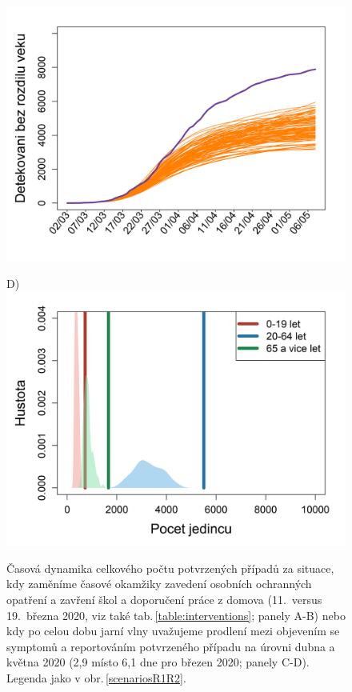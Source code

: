 \begin{figure}
\begin{center}
\begin{minipage}[m]{0.45\textwidth}
			\includegraphics[width = \textwidth]{pic/sc_testing.png}
		\end{minipage}
		\begin{minipage}[m]{0.45\textwidth}
			D) \\
			\includegraphics[width = \textwidth]{pic/sc_testing_PDF.png}
		\end{minipage}
	\end{center}
	\caption{Časová dynamika celkového počtu potvrzených případů za situace, kdy zaměníme časové okamžiky zavedení osobních ochranných opatření a zavření škol a doporučení práce z domova  (11.\ versus 19.\ března 2020, viz také tab.\,\ref{table:interventions}; panely A-B) nebo kdy po celou dobu jarní vlny uvažujeme prodlení mezi objevením se symptomů a reportováním potvrzeného případu na úrovni dubna a května 2020 (2,9 místo 6,1 dne pro březen 2020; panely C-D). Legenda jako v obr.\,\ref{scenariosR1R2}.}
	\label{switch}
\end{figure}

